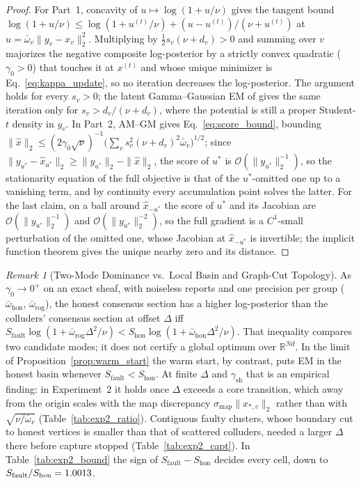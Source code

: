 \documentclass[11pt,a4paper]{article}
\theoremstyle{definition}
\theoremstyle{remark}
\newtheorem{remark}{Remark}
\newcommand{\R}{\mathbb{R}}
\begin{document}
\begin{proof}
For Part~1, concavity of $u \mapsto \log(1 + u/\nu)$ gives the tangent bound $\log(1 + u/\nu) \le \log(1 + u^{(t)}/\nu) + (u - u^{(t)})/(\nu + u^{(t)})$ at $u = \bar{\omega}_v\|y_v - x_v\|_2^2$. Multiplying by $\tfrac{1}{2}s_v(\nu + d_v) > 0$ and summing over $v$ majorizes the negative composite log-posterior by a strictly convex quadratic ($\gamma_0 > 0$) that touches it at $x^{(t)}$ and whose unique minimizer is Eq.~\eqref{eq:kappa_update}, so no iteration decreases the log-posterior. The argument holds for every $s_v > 0$; the latent Gamma--Gaussian EM of \cite{liu1995ml} gives the same iteration only for $s_v > d_v/(\nu + d_v)$, where the potential is still a proper Student-$t$ density in $y_v$. In Part~2, AM--GM gives Eq.~\eqref{eq:score_bound}, bounding $\|\hat{x}\|_2 \le (2\gamma_0\sqrt{\nu})^{-1}\bigl(\sum_v s_v^2(\nu+d_v)^2 \bar{\omega}_v\bigr)^{1/2}$; since $\|y_{u^*} - \hat{x}_{u^*}\|_2 \ge \|y_{u^*}\|_2 - \|\hat{x}\|_2$, the score of $u^*$ is $\mathcal{O}(\|y_{u^*}\|_2^{-1})$, so the stationarity equation of the full objective is that of the $u^*$-omitted one up to a vanishing term, and by continuity every accumulation point solves the latter. For the last claim, on a ball around $\hat{x}_{-u^*}$ the score of $u^*$ and its Jacobian are $\mathcal{O}(\|y_{u^*}\|_2^{-1})$ and $\mathcal{O}(\|y_{u^*}\|_2^{-2})$, so the full gradient is a $C^1$-small perturbation of the omitted one, whose Jacobian at $\hat{x}_{-u^*}$ is invertible; the implicit function theorem gives the unique nearby zero and its distance.
\end{proof}

\begin{remark}[Two-Mode Dominance vs.\ Local Basin and Graph-Cut Topology]
As $\gamma_0 \to 0^+$ on an exact sheaf, with noiseless reports and one precision per group ($\bar{\omega}_{\mathrm{hon}}$, $\bar{\omega}_{\mathrm{rog}}$), the honest consensus section has a higher log-posterior than the colluders' consensus section at offset $\Delta$ iff $S_{\mathrm{fault}} \log(1 + \bar{\omega}_{\mathrm{rog}}\Delta^2/\nu) < S_{\mathrm{hon}} \log(1 + \bar{\omega}_{\mathrm{hon}}\Delta^2/\nu)$. That inequality compares two candidate modes; it does not certify a global optimum over $\R^{Nd}$. In the limit of Proposition~\ref{prop:warm_start} the warm start, by contrast, puts EM in the honest basin whenever $S_{\mathrm{fault}} < S_{\mathrm{hon}}$. At finite $\Delta$ and $\gamma_{\mathrm{sh}}$ that is an empirical finding: in Experiment~2 it holds once $\Delta$ exceeds a core transition, which away from the origin scales with the map discrepancy $\sigma_{\mathrm{map}}\|x_{*,v}\|_2$ rather than with $\sqrt{\nu/\bar{\omega}_v}$ (Table~\ref{tab:exp2_ratio}). Contiguous faulty clusters, whose boundary cut to honest vertices is smaller than that of scattered colluders, needed a larger $\Delta$ there before capture stopped (Table~\ref{tab:exp2_capt}). In Table~\ref{tab:exp2_bound} the sign of $S_{\mathrm{fault}} - S_{\mathrm{hon}}$ decides every cell, down to $S_{\mathrm{fault}}/S_{\mathrm{hon}} = 1.0013$.
\end{remark}
\end{document}
